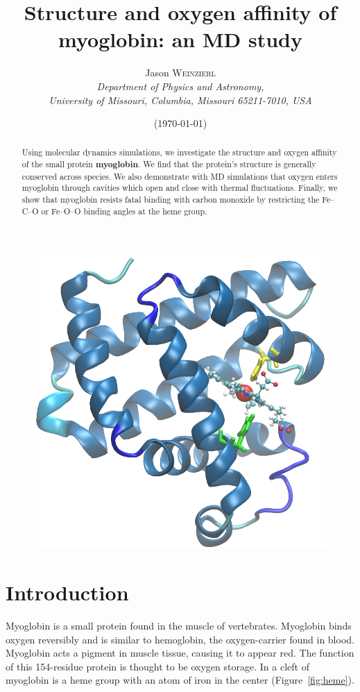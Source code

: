 \documentclass{article}
\title{Structure and oxygen affinity of myoglobin: an MD study}
\author{Jason \textsc{Weinzierl} \\
\textit{Department of Physics and Astronomy,} \\
\textit{University of Missouri, Columbia, Missouri 65211-7010, USA}}
\date{(\today)}
\begin{document}
\maketitle

\begin{figure}[h]
	\centering
	\includegraphics{myoglobin.png}
\end{figure}

\begin{abstract}
Using molecular dynamics simulations, we investigate the structure and oxygen affinity of the small protein \textbf{myoglobin}.  We find that the protein's structure is generally conserved across species.  We also demonstrate with MD simulations that oxygen enters myoglobin through cavities which open and close with thermal fluctuations.  Finally, we show that myoglobin resists fatal binding with carbon monoxide by restricting the Fe--C--O or Fe--O--O binding angles at the heme group.
\end{abstract}

\section{Introduction}

Myoglobin is a small protein found in the muscle of vertebrates.  Myoglobin binds oxygen reversibly and is similar to hemoglobin, the oxygen-carrier found in blood.  Myoglobin acts a pigment in muscle tissue, causing it to appear red.  The function of this 154-residue protein is thought to be oxygen storage.  In a cleft of myoglobin is a heme group with an atom of iron in the center (Figure~\ref{fig:heme}).
\end{document}
